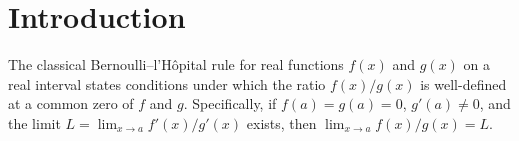 \documentclass{article}
\newcommand{\COMMENT}[3]{\begingroup\color{#2}\textbf{#1: }#3\endgroup}
\newcommand{\Sadashige}[1]{\COMMENT{Sadashige: }{blue}{#1}}
\newcommand{\Albert}[1]{{\color[rgb]{0.2,0.4,0.8}\textbf{Albert: } #1}}
\theoremstyle{theorem}
\theoremstyle{definition}
\begin{document}
\begin{abstract}
In calculus, l'H\^opital's rule provides a simple way to evaluate the limits of quotient functions when both the numerator and denominator vanish.  But what happens when we move beyond real functions on a real interval?  In this article, we study when the quotient of two complex-valued functions in higher dimension can be defined continuously at the points where both functions vanish.  Surprisingly, the answer is far subtler than in the real-valued setting.  We provide a complete characterization for the continuity of the quotient function.  We also point out why extending this result to smoother quotients remains an intriguing challenge.

\end{abstract}

\vspace{10px}


\vspace{10px}

\section{Introduction}
The classical Bernoulli--l'H\^opital rule for real functions \(f(x)\) and \(g(x)\) on a real interval states conditions under which the ratio \(f(x)/g(x)\) is well-defined at a common zero of \(f\) and \(g\).
Specifically, if \(f(a) = g(a) = 0\), \(g'(a)\neq 0\), and the limit \(L = \lim_{x\to a}f'(x)/g'(x)\) exists, then \(\lim_{x\to a}f(x)/g(x) = L\).
\end{document}
